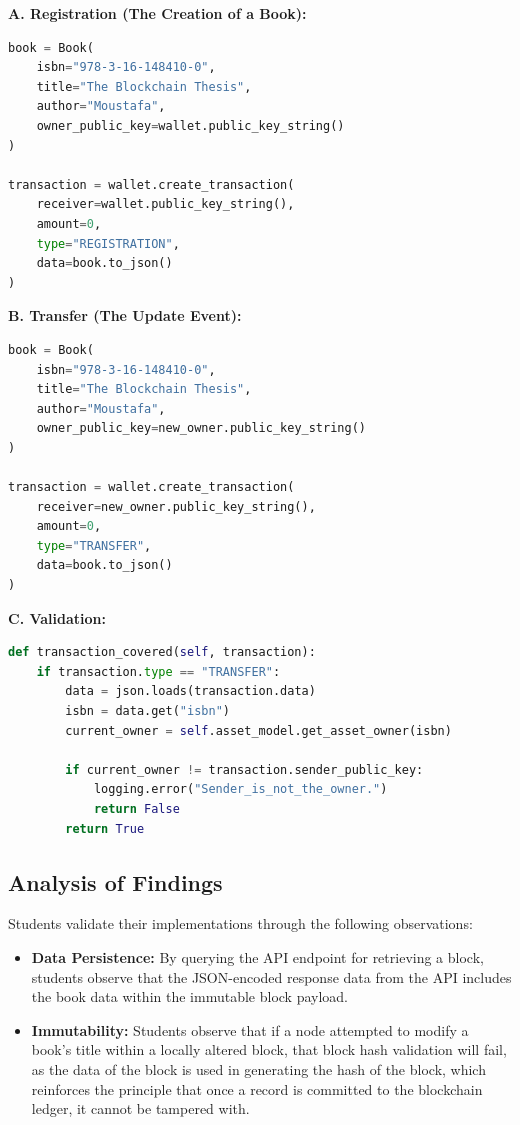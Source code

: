 \textbf{A. Registration (The Creation of a Book):}
\begin{lstlisting}[language=Python, caption=Book Creation Logic, label=lst:mod4_register]
book = Book(
    isbn="978-3-16-148410-0",
    title="The Blockchain Thesis",
    author="Moustafa",
    owner_public_key=wallet.public_key_string()
)

transaction = wallet.create_transaction(
    receiver=wallet.public_key_string(),
    amount=0,
    type="REGISTRATION",
    data=book.to_json()
)
\end{lstlisting}
\textbf{B. Transfer (The Update Event):}\\
\begin{lstlisting}[language=Python, caption=Book Transfer Logic, label=lst:mod4_transfer]
book = Book(
    isbn="978-3-16-148410-0",
    title="The Blockchain Thesis",
    author="Moustafa",
    owner_public_key=new_owner.public_key_string()
)

transaction = wallet.create_transaction(
    receiver=new_owner.public_key_string(),
    amount=0,
    type="TRANSFER",
    data=book.to_json()
)
\end{lstlisting}

\textbf{C. Validation:}\\

\begin{lstlisting}[language=Python, caption=Transaction Validation Logic, label=lst:mod4_verify]
def transaction_covered(self, transaction):
    if transaction.type == "TRANSFER":
        data = json.loads(transaction.data)
        isbn = data.get("isbn")
        current_owner = self.asset_model.get_asset_owner(isbn)
        
        if current_owner != transaction.sender_public_key:
            logging.error("Sender_is_not_the_owner.")
            return False
        return True
\end{lstlisting}
\subsection{Analysis of Findings}
Students validate their implementations through the following observations:

\begin{itemize}
    \item \textbf{Data Persistence:}  
    By querying the API endpoint for retrieving a block, students observe that the JSON-encoded response data from the API includes the book data within the immutable block payload.

    \item \textbf{Immutability:}  
    Students observe that if a node attempted to modify a book’s title within a locally altered block, that block hash validation will fail, as the data of the block is used in generating the hash of the block, which reinforces the principle that once a record is committed to the blockchain ledger, it cannot be tampered with.
\end{itemize}

